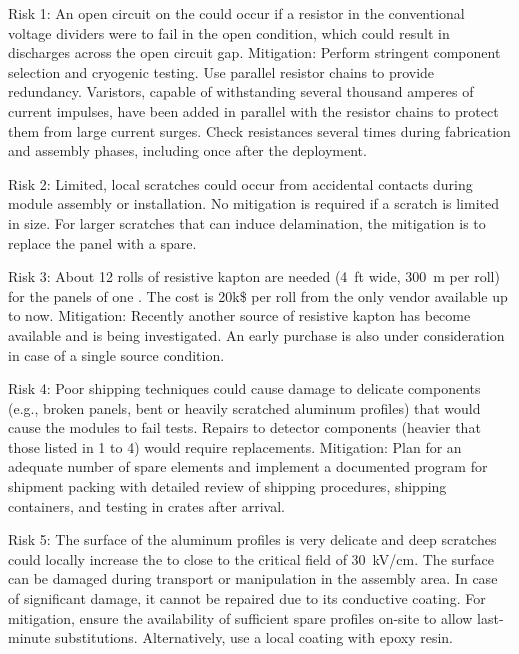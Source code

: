 Risk 1: An open circuit on the  could occur if a resistor in the conventional voltage dividers were to fail in the open condition, which %
could result in  discharges across the open circuit gap. Mitigation: Perform stringent component selection and cryogenic testing. Use parallel resistor chains to provide redundancy. Varistors, capable of withstanding several thousand amperes of current impulses, have been added in parallel with the resistor chains to protect them from large current surges. Check resistances %
several times during  fabrication and assembly phases, including once after the  deployment.   

Risk 2: Limited, local scratches could %
occur from accidental contacts during module assembly or installation. No mitigation is required if a scratch is limited in size. For larger scratches that can induce delamination, the mitigation is to replace the panel with a spare. 

Risk 3: About 12 rolls of resistive kapton are needed (\SI{4}{ft} wide, \SI{300}{m} per roll)  for the  panels of one .  The cost is 20k\$ per roll from the only vendor available up to now. Mitigation: Recently another source of resistive kapton has become available and is being investigated. An early purchase is also under consideration in case of a single source condition.

Risk 4: Poor shipping techniques could cause damage to delicate components (e.g., broken  panels, bent or heavily scratched aluminum profiles) that would cause the modules to fail  tests. %
Repairs to detector components (heavier that those listed in 1 to 4) would require replacements.   Mitigation: Plan for an adequate number of spare elements and implement %
a documented  program for shipment packing with detailed review of shipping procedures, shipping containers, and testing in crates after arrival.

Risk 5: The surface of the aluminum profiles is very delicate and deep scratches could locally increase the \efield to close to the critical field of \SI{30}{\kV}/cm. The surface can be damaged during transport or manipulation in the assembly area. In case of significant damage, it cannot be repaired due to its conductive coating. For mitigation, ensure the availability of sufficient spare profiles %
on-site to allow last-minute substitutions. Alternatively, use a local coating with epoxy resin. %

